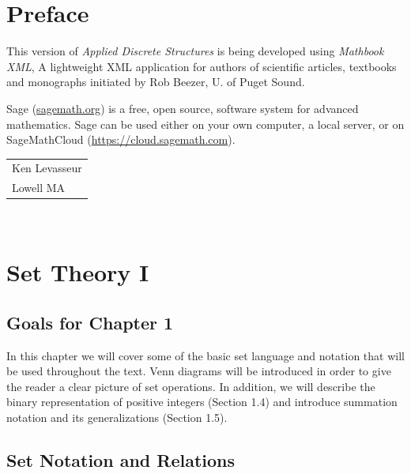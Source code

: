 \documentclass[10pt,]{book}
\theoremstyle{plain}
\theoremstyle{definition}
\theoremstyle{definition}
\theoremstyle{definition}
\theoremstyle{definition}
\numberwithin{equation}{section}
\begin{document}
\chapter*{Preface}\label{preface-1}
This version of \emph{Applied Discrete Structures} is being developed using \emph{Mathbook XML}, A lightweight XML application for authors of scientific articles, textbooks and monographs initiated by Rob Beezer, U. of Puget Sound.  %
\par
Sage (\href{http://sagemath.org}{sagemath.org}) is a free, open source, software system for advanced mathematics.  Sage can be used either on your own computer, a local server, or on SageMathCloud (\href{https://cloud.sagemath.com}{https://cloud.sagemath.com}). %
\par\hfill\begin{tabular}{l@{}}
Ken Levasseur\\
Lowell MA
\end{tabular}\\\par
\setcounter{tocdepth}{1}
\renewcommand*\contentsname{Contents}
\tableofcontents
\mainmatter
\typeout{************************************************}
\typeout{************************************************}
\chapter[Set Theory I]{Set Theory I}\label{chapter_5}
\typeout{************************************************}
\typeout{************************************************}
\section*{Goals for Chapter 1}
In this chapter we will cover some of the basic set language and notation that will be used throughout the text. Venn diagrams will be introduced in order to give the reader a clear picture of set operations. In addition, we will describe the binary representation of positive integers (Section 1.4) and introduce summation notation and its generalizations (Section 1.5).%
\typeout{************************************************}
\typeout{************************************************}
\section[Set Notation and Relations ]{Set Notation and Relations }\label{Set-Notation-and-Relations}
\typeout{************************************************}
\typeout{************************************************}
\end{document}
